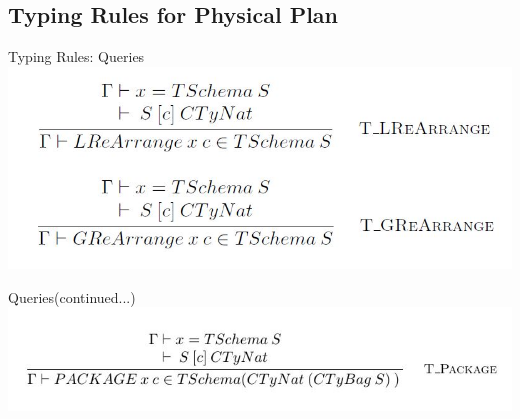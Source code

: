 \subsection{Typing Rules for Physical Plan}
\begin{frame}{Typing Rules: Queries}
\centering
\includegraphics[scale=0.4]{Images/TypingRules/ReArrange.JPG}
\end{frame}

\begin{frame}{Queries(continued...)}
\centering
\includegraphics[scale=0.4]{Images/TypingRules/Package.JPG}
\end{frame}

